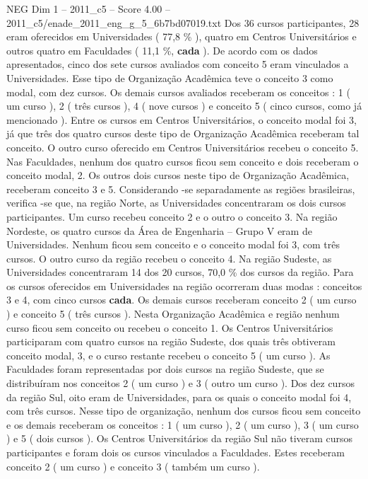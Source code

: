 \begin{textsample}{NEG Dim 1 – 2011\_c5 – Score 4.00 – 2011\_c5/enade\_2011\_eng\_g\_5\_6b7bd07019.txt}
Dos 36 cursos participantes, 28 eram oferecidos em Universidades ( 77,8 \% ), quatro em Centros Universitários e outros quatro em Faculdades ( 11,1 \%, \textbf{cada} ).
De acordo com os dados apresentados, cinco dos sete cursos avaliados com conceito 5 eram vinculados a Universidades.
Esse tipo de Organização Acadêmica teve o conceito 3 como modal, com dez cursos.
Os demais cursos avaliados receberam os conceitos : 1 ( um curso ), 2 ( três cursos ), 4 ( nove cursos ) e conceito 5 ( cinco cursos, como já mencionado ).
Entre os cursos em Centros Universitários, o conceito modal foi 3, já que três dos quatro cursos deste tipo de Organização Acadêmica receberam tal conceito.
O outro curso oferecido em Centros Universitários recebeu o conceito 5.
Nas Faculdades, nenhum dos quatro cursos ficou sem conceito e dois receberam o conceito modal, 2.
Os outros dois cursos neste tipo de Organização Acadêmica, receberam conceito 3 e 5.
Considerando -se separadamente as regiões brasileiras, verifica -se que, na região Norte, as Universidades concentraram os dois cursos participantes.
Um curso recebeu conceito 2 e o outro o conceito 3.
Na região Nordeste, os quatro cursos da Área de Engenharia – Grupo V eram de Universidades.
Nenhum ficou sem conceito e o conceito modal foi 3, com três cursos.
O outro curso da região recebeu o conceito 4.
Na região Sudeste, as Universidades concentraram 14 dos 20 cursos, 70,0 \% dos cursos da região.
Para os cursos oferecidos em Universidades na região ocorreram duas modas : conceitos 3 e 4, com cinco cursos \textbf{cada}.
Os demais cursos receberam conceito 2 ( um curso ) e conceito 5 ( três cursos ).
Nesta Organização Acadêmica e região nenhum curso ficou sem conceito ou recebeu o conceito 1.
Os Centros Universitários participaram com quatro cursos na região Sudeste, dos quais três obtiveram conceito modal, 3, e o curso restante recebeu o conceito 5 ( um curso ).
As Faculdades foram representadas por dois cursos na região Sudeste, que se distribuíram nos conceitos 2 ( um curso ) e 3 ( outro um curso ).
Dos dez cursos da região Sul, oito eram de Universidades, para os quais o conceito modal foi 4, com três cursos.
Nesse tipo de organização, nenhum dos cursos ficou sem conceito e os demais receberam os conceitos : 1 ( um curso ), 2 ( um curso ), 3 ( um curso ) e 5 ( dois cursos ).
Os Centros Universitários da região Sul não tiveram cursos participantes e foram dois os cursos vinculados a Faculdades.
Estes receberam conceito 2 ( um curso ) e conceito 3 ( também um curso ).

\end{textsample}
